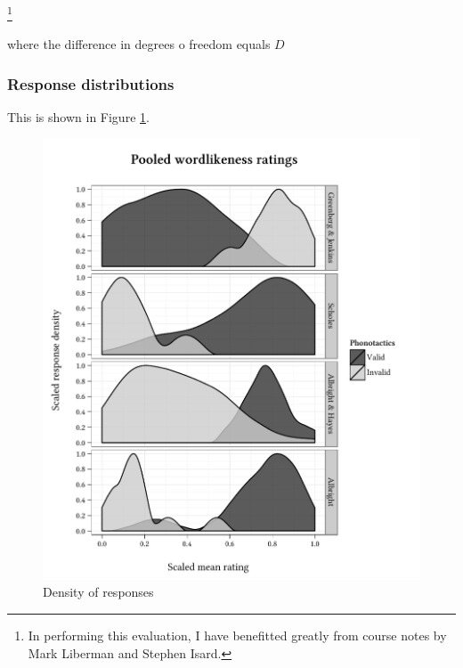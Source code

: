 

\citet{EM}

\footnote{In performing this evaluation, I have benefitted greatly from course notes by Mark Liberman and Stephen Isard.}


where the difference in degrees o freedom equals $D$


\subsubsection{Response distributions}

This is shown in Figure \ref{density}.

\begin{figure}
\centering
\includegraphics{density.pdf}
\caption{Density of responses}
\label{density}
\end{figure}

